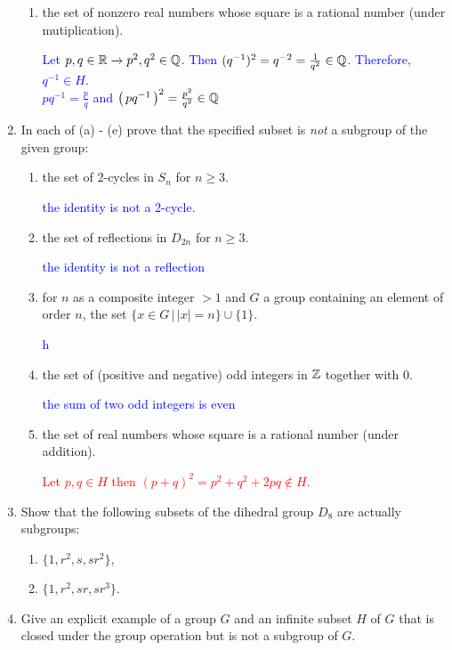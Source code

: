 \documentclass[10pt,a4paper]{report}
\newcommand{\RED}[1]{\textcolor{red}{#1}}
\newcommand{\BLUE}[1]{\textcolor{blue}{#1}}
\begin{document}
\begin{enumerate}
\begin{enumerate}
	\item the set of nonzero real numbers whose square is a rational number (under mutiplication).
	
	\BLUE{Let $p,q \in \mathbb{R} \to p^2, q^2 \in \mathbb{Q}$.  Then $(q^{-1})^2 = q^{-2} = \frac{1}{q^2} \in \mathbb{Q}$. Therefore, $q^{-1} \in H$.\\
	$pq^{-1} = \frac{p}{q}$ and $\left (\, pq^{-1} \,\right )^2 = \frac{p^2}{q^2} \in \mathbb{Q}$
	}
	
\end{enumerate}

\item In each of (a) - (e) prove that the specified subset is \textit{not} a subgroup of the given group:
\begin{enumerate}
	\item the set of 2-cycles in $S_n$ for $n \ge 3$.
	
	\BLUE{the identity is not a 2-cycle.}
	
	\item the set of reflections in $D_{2n}$ for $n \ge 3$.
	
	\BLUE{the identity is not a reflection}
	
	\item for $n$ as a composite integer $> 1$ and $G$ a group  containing an element of order $n$, the set $\{x \in G\,|\, |x|=n\} \cup \{1\}$.
	
	\BLUE{h
	}
	
	\item the set of (positive and negative) odd integers in $\mathbb{Z}$ together with 0.
	
	\BLUE{the sum of two odd integers is even}
	
	\item the set of real numbers whose square is a rational number (under addition).
	
	\RED{Let $p, q \in H$  then $(p+q)^2=p^2+q^2+2pq \not \in H$.
	}
	
\end{enumerate}

\item Show that the following subsets of the dihedral group $D_8$ are actually subgroups:
\begin{enumerate}
	\item $\{1,r^2, s,sr^2\}$,
	\item $\{1,r^2,sr,sr^3\}$.
\end{enumerate}

\item Give an explicit example of a group $G$ and an infinite subset $H$ of $G$ that is closed under the group operation but is not a subgroup of $G$.


\end{enumerate}
\end{document}
